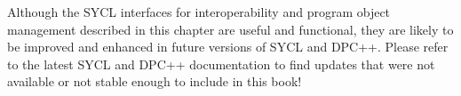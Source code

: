 \begin{tcolorbox}[colback=blue!5!white,colframe=blue!75!black, title=IMPROVING INTEROPERABILITY AND PROGRAM OBJECT MANAGEMENT]
Although the SYCL interfaces for interoperability and program object management described in this chapter are useful and functional, they are likely to be improved and enhanced in future versions of SYCL and DPC++. Please refer to the latest SYCL and DPC++ documentation to find updates that were not available or not stable enough to include in this book!
\end{tcolorbox}






































